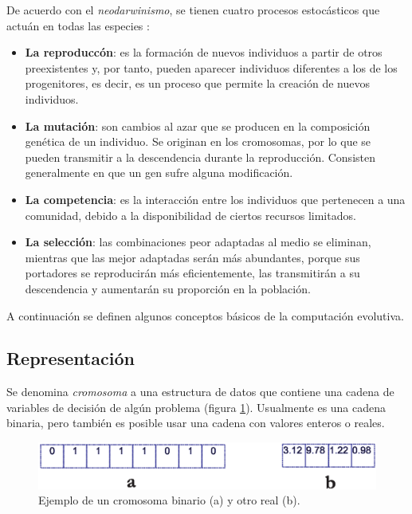 \begin{itemize}
   De acuerdo con el \textit{neodarwinismo}, se tienen cuatro procesos estoc\'asticos que actu\'an en todas las especies
   \cite{hoffman89}:
   \begin{itemize}
    \item \textbf{La reproducc\'on}: es la formaci\'on de nuevos individuos a partir de otros preexistentes y, por tanto, 
    pueden aparecer individuos diferentes a los de los progenitores, es decir, es un proceso que permite la creaci\'on 
    de nuevos individuos.
    \item \textbf{La mutaci\'on}: son cambios al azar que se producen en la composici\'on gen\'etica de un individuo. Se 
    originan en los cromosomas, por lo que se pueden transmitir a la descendencia durante la reproducci\'on. Consisten 
    generalmente en que un gen sufre alguna modificaci\'on. 
    \item \textbf{La competencia}: es la interacci\'on entre los individuos que pertenecen a una comunidad, debido a la 
    disponibilidad de ciertos recursos limitados.
    \item \textbf{La selecci\'on}: las combinaciones peor adaptadas al medio se eliminan, mientras que las mejor adaptadas 
    ser\'an m\'as abundantes, porque sus portadores se reproducir\'an m\'as eficientemente, las transmitir\'an a su descendencia 
    y aumentar\'an su proporci\'on en la poblaci\'on. 
   \end{itemize}
  \end{itemize}
  
  A continuaci\'on se definen algunos conceptos b\'asicos de la computaci\'on evolutiva.
  
  \subsection{Representaci\'on}
  
  Se denomina \textit{cromosoma} a una estructura de datos que contiene una cadena de variables de decisi\'on de alg\'un 
  problema (figura \ref{fig:cromosoma}). Usualmente es una cadena binaria, pero tambi\'en es posible usar una cadena con 
  valores enteros o reales.

  \begin{figure}[H]
	\centering
	\includegraphics[scale=0.45]{Cap2/1-16.eps}
	  \caption{Ejemplo de un cromosoma binario (a) y otro real (b).}
      \label{fig:cromosoma}
      \end{figure}
  

